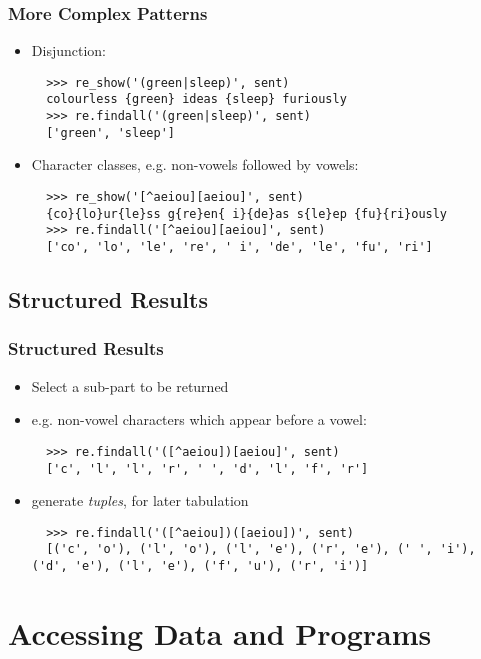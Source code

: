 \documentclass{beamer}             %
\begin{document}
\begin{frame}[fragile]
\frametitle{More Complex Patterns}

\begin{itemize}
\item Disjunction:

\begin{verbatim}
  >>> re_show('(green|sleep)', sent)
  colourless {green} ideas {sleep} furiously
  >>> re.findall('(green|sleep)', sent)
  ['green', 'sleep']
\end{verbatim}

\item Character classes, e.g. non-vowels followed by vowels:

\begin{verbatim}
  >>> re_show('[^aeiou][aeiou]', sent)
  {co}{lo}ur{le}ss g{re}en{ i}{de}as s{le}ep {fu}{ri}ously
  >>> re.findall('[^aeiou][aeiou]', sent)
  ['co', 'lo', 'le', 're', ' i', 'de', 'le', 'fu', 'ri']
\end{verbatim}
\end{itemize}
\end{frame}

\subsection{Structured Results}

\begin{frame}[fragile]
\frametitle{Structured Results}
\begin{itemize}
\item Select a sub-part to be returned
\item e.g. non-vowel characters which appear before a vowel:

\begin{verbatim}
  >>> re.findall('([^aeiou])[aeiou]', sent)
  ['c', 'l', 'l', 'r', ' ', 'd', 'l', 'f', 'r']
\end{verbatim}

\item generate \textit{tuples}, for later tabulation

\begin{verbatim}
  >>> re.findall('([^aeiou])([aeiou])', sent)
  [('c', 'o'), ('l', 'o'), ('l', 'e'), ('r', 'e'), (' ', 'i'), ('d', 'e'), ('l', 'e'), ('f', 'u'), ('r', 'i')]
\end{verbatim}
\end{itemize}
\end{frame}

\section{Accessing Data and Programs}
\end{document}
